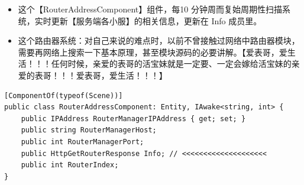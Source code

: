 \documentclass[9pt, b5paper]{article}
\begin{document}
\begin{itemize}
\begin{itemize}
\end{itemize}
\item 这个【RouterAddressComponent】组件，每10 分钟周而复始周期性扫描系统，实时更新【服务端各小服】的相关信息，更新在 Info 成员里。
\item 这个路由器系统：对自己来说的难点时，以前不曾接触过网络中路由器模块，需要再网络上搜索一下基本原理，甚至模块源码的必要讲解。【爱表哥，爱生活！！！任何时候，亲爱的表哥的活宝妹就是一定要、一定会嫁给活宝妹的亲爱的表哥！！！爱表哥，爱生活！！！】
\end{itemize}
\begin{verbatim}
[ComponentOf(typeof(Scene))]
public class RouterAddressComponent: Entity, IAwake<string, int> {
    public IPAddress RouterManagerIPAddress { get; set; }
    public string RouterManagerHost;
    public int RouterManagerPort;
    public HttpGetRouterResponse Info; // <<<<<<<<<<<<<<<<<<<< 
    public int RouterIndex;
}
\end{verbatim}
\end{document}
